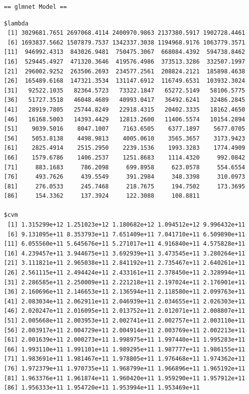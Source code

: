 \documentclass[
]{article}
\begin{document}
\begin{verbatim}
== glmnet Model ==
\end{verbatim}

\begin{verbatim}
$lambda
 [1] 3029681.7651 2697068.4114 2400970.9863 2137380.5917 1902728.4461
 [6] 1693837.5662 1507879.7537 1342337.3038 1194968.9176 1063779.3571
[11]  946992.4313  843026.9481  750475.3067  668084.4392  594738.8462
[16]  529445.4927  471320.3646  419576.4986  373513.3286  332507.1997
[21]  296002.9252  263506.2693  234577.2561  208824.2121  185898.4638
[26]  165489.6168  147321.3534  131147.6912  116749.6531  103932.3024
[31]   92522.1035   82364.5723   73322.1847   65272.5149   58106.5775
[36]   51727.3518   46048.4689   40993.0417   36492.6241   32486.2845
[41]   28919.7805   25744.8249   22918.4315   20402.3335   18162.4650
[46]   16168.5003   14393.4429   12813.2600   11406.5574   10154.2894
[51]    9039.5016    8047.1007    7163.6505    6377.1897    5677.0705
[56]    5053.8138    4498.9813    4005.0610    3565.3657    3173.9423
[61]    2825.4914    2515.2950    2239.1536    1993.3283    1774.4909
[66]    1579.6786    1406.2537    1251.8683    1114.4320     992.0842
[71]     883.1683     786.2098     699.8958     623.0578     554.6554
[76]     493.7626     439.5549     391.2984     348.3398     310.0973
[81]     276.0533     245.7468     218.7675     194.7502     173.3695
[86]     154.3362     137.3924     122.3088     108.8811

$cvm
 [1] 1.315299e+12 1.251023e+12 1.180682e+12 1.094512e+12 9.996432e+11
 [6] 9.131095e+11 8.353793e+11 7.651409e+11 7.041710e+11 6.509890e+11
[11] 6.055560e+11 5.645676e+11 5.271017e+11 4.916840e+11 4.575828e+11
[16] 4.239457e+11 3.944675e+11 3.692939e+11 3.473545e+11 3.280264e+11
[21] 3.111821e+11 2.965038e+11 2.841192e+11 2.735467e+11 2.640261e+11
[26] 2.561115e+11 2.494424e+11 2.433161e+11 2.378450e+11 2.328994e+11
[31] 2.286585e+11 2.250009e+11 2.221218e+11 2.197024e+11 2.176901e+11
[36] 2.160696e+11 2.146653e+11 2.136594e+11 2.118580e+11 2.099763e+11
[41] 2.083034e+11 2.062911e+11 2.046939e+11 2.034655e+11 2.026303e+11
[46] 2.020247e+11 2.016095e+11 2.013752e+11 2.012071e+11 2.008807e+11
[51] 2.005668e+11 2.003953e+11 2.002741e+11 2.002757e+11 2.003110e+11
[56] 2.003917e+11 2.004729e+11 2.004914e+11 2.003769e+11 2.002213e+11
[61] 2.001639e+11 2.000273e+11 1.998975e+11 1.997440e+11 1.995283e+11
[66] 1.993110e+11 1.991101e+11 1.989295e+11 1.987777e+11 1.986155e+11
[71] 1.983691e+11 1.981467e+11 1.978805e+11 1.976468e+11 1.974362e+11
[76] 1.972379e+11 1.970735e+11 1.968799e+11 1.966896e+11 1.965192e+11
[81] 1.963376e+11 1.961874e+11 1.960420e+11 1.959290e+11 1.957912e+11
[86] 1.956333e+11 1.954720e+11 1.953994e+11 1.953469e+11


\end{verbatim}
\end{document}
